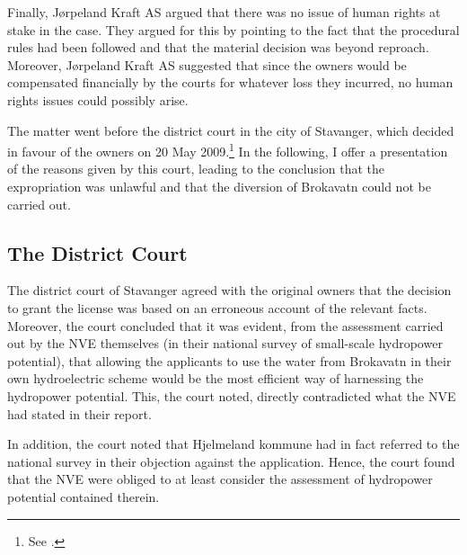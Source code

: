 
Finally, Jørpeland Kraft AS argued that there was no issue of human rights at stake in the case. They argued for this by pointing to the fact that the procedural rules had been followed and that the material decision was beyond reproach. Moreover, Jørpeland Kraft AS suggested that since the owners would be compensated financially by the courts for whatever loss they incurred, no human rights issues could possibly arise.

The matter went before the district court in the city of Stavanger, which decided in favour of the owners on 20 May 2009.\footnote{See \cite{jorpeland09}.} In the following, I offer a presentation of the reasons given by this court, leading to the conclusion that the expropriation was unlawful and that the diversion of Brokavatn could not be carried out.

\subsection{The District Court}

The district court of Stavanger agreed with the original owners that the decision to grant the license was based on an erroneous account of the relevant facts. Moreover, the court concluded that it was evident, from the assessment carried out by the NVE themselves (in their national survey of small-scale hydropower potential), that allowing the applicants to use the water from Brokavatn in their own hydroelectric scheme would be the most efficient way of harnessing the hydropower potential. This, the court noted, directly contradicted what the NVE had stated in their report.

In addition, the court noted that Hjelmeland kommune had in fact referred to the national survey in their objection against the application. Hence, the court found that the NVE were obliged to at least consider the assessment of hydropower potential contained therein.

